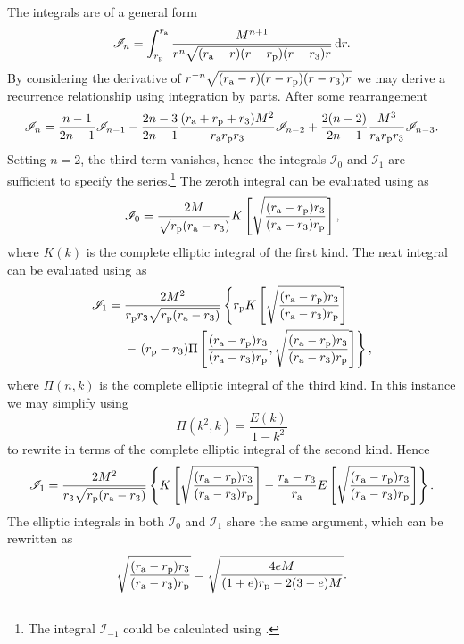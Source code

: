 The integrals are of a general form
\begin{equation}
\mathscr{I}_n = \int_{r_\mathrm{p}}^{r_\mathrm{a}}{\frac{M^{n+1}}{r^n\sqrt{(r_\mathrm{a} - r)(r - r_\mathrm{p})(r - r_3)r}}}\,\mathrm{d}{r}.
\end{equation}
By considering the derivative of $r^{-n}\sqrt{(r_\mathrm{a} - r)(r - r_\mathrm{p})(r - r_3)r}$ we may derive a recurrence relationship using integration by parts. After some rearrangement
\begin{equation}
\mathscr{I}_n = \frac{n - 1}{2n - 1}\mathscr{I}_{n-1} - \frac{2n - 3}{2n - 1} \frac{(r_\mathrm{a} + r_\mathrm{p} + r_3)M^2}{r_\mathrm{a}r_\mathrm{p}r_3}\mathscr{I}_{n-2} + \frac{2(n - 2)}{2n-1}\frac{M^3}{r_\mathrm{a}r_\mathrm{p}r_3}\mathscr{I}_{n-3}.
\end{equation}
Setting $n = 2$, the third term vanishes, hence the integrals $\mathscr{I}_0$ and $\mathscr{I}_1$ are sufficient to specify the series.\footnote{The integral $\mathscr{I}_{-1}$ could be calculated using \citet[3.148.6]{Gradshteyn2000}.} The zeroth integral can be evaluated using \citet[3.147.6]{Gradshteyn2000} as
\begin{equation}
\mathscr{I}_0 = \frac{2M}{\sqrt{r_\mathrm{p}(r_\mathrm{a} - r_3)}}K\left[\sqrt{\frac{(r_\mathrm{a} - r_\mathrm{p})r_3}{(r_\mathrm{a} - r_3)r_\mathrm{p}}}\right],
\end{equation}
where $K(k)$ is the complete elliptic integral of the first kind. The next integral can be evaluated using \citet[3.149.6]{Gradshteyn2000} as
\begin{align}
\mathscr{I}_1 = {} & \frac{2M^2}{r_\mathrm{p}r_3\sqrt{r_\mathrm{p}(r_\mathrm{a} - r_3)}}\left\{r_\mathrm{p}K\left[\sqrt{\frac{(r_\mathrm{a} - r_\mathrm{p})r_3}{(r_\mathrm{a} - r_3)r_\mathrm{p}}}\right]\right. \nonumber \\*
 {} & - \left.(r_\mathrm{p} - r_3)\Pi\left[\frac{(r_\mathrm{a} - r_\mathrm{p})r_3}{(r_\mathrm{a} - r_3)r_\mathrm{p}}, \sqrt{\frac{(r_\mathrm{a} - r_\mathrm{p})r_3}{(r_\mathrm{a} - r_3)r_\mathrm{p}}}\right]\right\},
\end{align}
where $\Pi(n,k)$ is the complete elliptic integral of the third kind. In this instance we may simplify using \citet[19.6.2]{Olver2010}
\begin{equation}
\Pi(k^2,k) = \frac{E(k)}{1 - k^2}
\end{equation}
to rewrite in terms of the complete elliptic integral of the second kind. Hence
\begin{equation}
\mathscr{I}_1 = \frac{2M^2}{r_3\sqrt{r_\mathrm{p}(r_\mathrm{a} - r_3)}}\left\{K\left[\sqrt{\frac{(r_\mathrm{a} - r_\mathrm{p})r_3}{(r_\mathrm{a} - r_3)r_\mathrm{p}}}\right] - \frac{r_\mathrm{a} - r_3}{r_\mathrm{a}}E\left[\sqrt{\frac{(r_\mathrm{a} - r_\mathrm{p})r_3}{(r_\mathrm{a} - r_3)r_\mathrm{p}}}\right]\right\}.
\end{equation}
The elliptic integrals in both $\mathscr{I}_0$ and $\mathscr{I}_1$ share the same argument, which can be rewritten as
\begin{equation}
\sqrt{\frac{(r_\mathrm{a} - r_\mathrm{p})r_3}{(r_\mathrm{a} - r_3)r_\mathrm{p}}} = \sqrt{\frac{4 e M}{(1+e) r_\mathrm{p} - 2(3 - e)M}}.
\end{equation}

